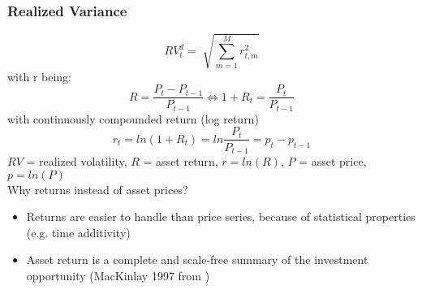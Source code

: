 \documentclass[aspectratio=169]{beamer}
\begin{document}
\begin{frame}
\frametitle{Realized Variance}
\begin{footnotesize}
	\begin{equation}
	RV^{d}_{t} = \sqrt[]{\sum_{m=1}^{M} r^{2}_{t,m}}
	\end{equation}
with r being: 
	\begin{equation}
	R = \frac{P_{t} - P_{t-1}}{P_{t-1}} 
	\Leftrightarrow 1 + R_{t} = \frac{P_{t}}{P_{t-1}}
	\end{equation}
	with continuously compounded return (log return)
	\begin{equation}
	r_{t} = ln(1 + R_{t}) = ln\frac{P_{t}}{P_{t-1}} = p_{t} - p_{t-1}
	\end{equation}
	$RV$ = realized volatility, $R$ = asset return, $r = ln(R)$, $P$ = asset price, $p=ln(P)$\\
Why returns instead of asset prices?\\
	\begin{itemize}
	\item Returns are easier to handle than price series, because of statistical properties (e.g. time additivity)
	\item Asset return is a complete and scale-free summary of the investment opportunity (MacKinlay 1997 from \textcite{tsay2005})
	\end{itemize}
\end{footnotesize}
\end{frame}
\end{document}

